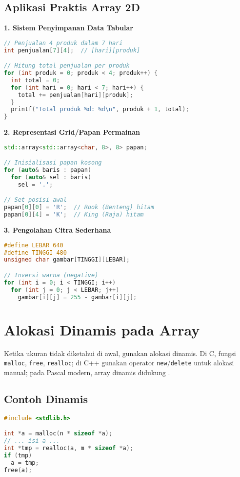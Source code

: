 \documentclass[../main.tex]{subfiles}
\begin{document}
\subsection{Aplikasi Praktis Array 2D}

\textbf{1. Sistem Penyimpanan Data Tabular}
\begin{lstlisting}[language=C, caption={Tabel data penjualan}]
// Penjualan 4 produk dalam 7 hari
int penjualan[7][4];  // [hari][produk]

// Hitung total penjualan per produk
for (int produk = 0; produk < 4; produk++) {
  int total = 0;
  for (int hari = 0; hari < 7; hari++) {
    total += penjualan[hari][produk];
  }
  printf("Total produk %d: %d\n", produk + 1, total);
}
\end{lstlisting}

\textbf{2. Representasi Grid/Papan Permainan}
\begin{lstlisting}[language=C++, caption={Papan catur 8x8}]
std::array<std::array<char, 8>, 8> papan;

// Inisialisasi papan kosong
for (auto& baris : papan)
  for (auto& sel : baris)
    sel = '.';

// Set posisi awal
papan[0][0] = 'R';  // Rook (Benteng) hitam
papan[0][4] = 'K';  // King (Raja) hitam
\end{lstlisting}

\textbf{3. Pengolahan Citra Sederhana}
\begin{lstlisting}[language=C, caption={Matriks pixel grayscale}]
#define LEBAR 640
#define TINGGI 480
unsigned char gambar[TINGGI][LEBAR];

// Inversi warna (negative)
for (int i = 0; i < TINGGI; i++)
  for (int j = 0; j < LEBAR; j++)
    gambar[i][j] = 255 - gambar[i][j];
\end{lstlisting}

\section{Alokasi Dinamis pada Array}
Ketika ukuran tidak diketahui di awal, gunakan alokasi dinamis. Di C, fungsi \texttt{malloc}, \texttt{free}, \texttt{realloc}; di C++ gunakan operator \texttt{new}/\texttt{delete} untuk alokasi manual; pada Pascal modern, array dinamis didukung \parencite{iso-c-draft-n1570,cpp-reference,free-pascal-docs,pascal-dynarray}.

\subsection{Contoh Dinamis}
\begin{lstlisting}[language=C, caption={malloc/realloc/free di C}]
#include <stdlib.h>

int *a = malloc(n * sizeof *a);
// ... isi a ...
int *tmp = realloc(a, m * sizeof *a);
if (tmp)
  a = tmp;
free(a);
\end{lstlisting}
\end{document}
